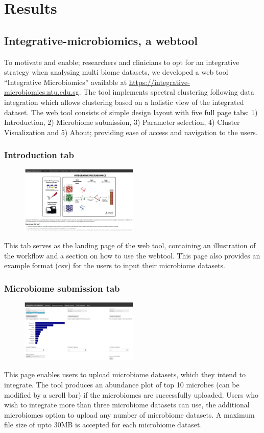 \section{Results}

\subsection{Integrative-microbiomics, a webtool}

To motivate and enable; researchers and clinicians to opt for an integrative strategy when analysing multi biome datasets, we developed a web tool “Integrative Microbiomics” available at  \url{https://integrative-microbiomics.ntu.edu.sg}. The tool implements spectral clustering following data integration which allows clustering based on a holistic view of the integrated dataset. The web tool consists of simple design layout with five full page tabs: 1) Introduction, 2) Microbiome submission, 3) Parameter selection, 4) Cluster Visualization and 5) About; providing ease of access and navigation to the users.
\subsubsection{Introduction tab}
\begin{figure}[H]
	\centering
	\includegraphics[width=0.5\textwidth]{image/Introduction_tab.PNG}
\end{figure}
This tab serves as the landing page of the web tool, containing an illustration of the workflow and a section on how to use the webtool. This page also provides an example format (csv) for the users to input their microbiome datasets.
\subsubsection{Microbiome submission tab}
\begin{figure}[!h]
	\centering
\includegraphics[width=0.5\textwidth]{image/microbiome_sub-tab.PNG}
\end{figure}
This page enables users to upload microbiome datasets, which they intend to integrate. The tool produces an abundance plot of top 10 microbes (can be modified by a scroll bar) if the microbiomes are successfully uploaded. Users who wish to integrate more than three microbiome datasets can use, the additional microbiomes option to upload any number of microbiome datasets. A maximum file size of upto 30MB is accepted for each microbiome dataset.
